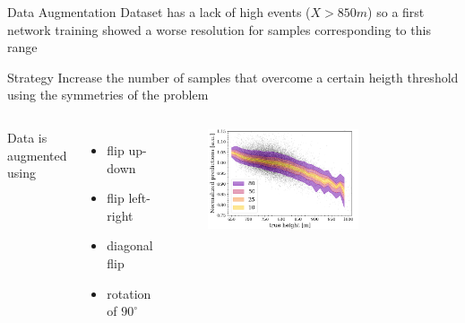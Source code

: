 \documentclass{beamer}
\begin{document}
\begin{frame}{Data Augmentation}
        Dataset has a lack of high events ($X > 850\si{m}$) so a first network training showed a worse resolution
        for samples corresponding to this range
    
        \begin{block}{Strategy}
            Increase the number of samples that overcome a certain heigth threshold using the
            symmetries of the problem
        \end{block}
    
        \begin{columns}
            Data is augmented using
        \begin{itemize}
            \item flip up-down
            \item flip left-right
            \item diagonal flip
            \item rotation of $90^{\circ}$
        \end{itemize}
        \begin{figure}
            \centering
            \includegraphics[width=0.7\textwidth]{figures/hetero1.png}
        \end{figure}
        \end{columns}
        
        
    
    \end{frame}
\end{document}
